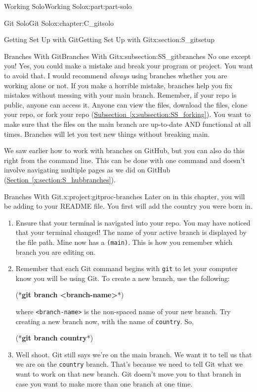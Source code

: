 \documentclass[oneside,10pt,]{book}
\newcommand{\xreffont}{\relax}
\newcommand{\mono}[1]{\texttt{#1}}
\newcommand{\consoleinput}[1]{\textbf{#1}}
\begin{document}
\begin{partptx}{Working Solo}{}{Working Solo}{}{}{x:part:part-solo}
\begin{chapterptx}{Git Solo}{}{Git Solo}{}{}{x:chapter:C_gitsolo}
\begin{sectionptx}{Getting Set Up with Git}{}{Getting Set Up with Git}{}{}{x:section:S_gitsetup}
\begin{subsectionptx}{Branches With Git}{}{Branches With Git}{}{}{x:subsection:SS_gitbranches}
No one except you! Yes, you could make a mistake and break your program or project. You want to avoid that. I would recommend \emph{always} using branches whether you are working alone or not. If you make a horrible mistake, branches help you fix mistakes without messing with your main branch. Remember, if your repo is public, anyone can access it. Anyone can view the files, download the files, clone your repo, or fork your repo (\hyperref[x:subsection:SS_forking]{Subsection~{\xreffont\ref{x:subsection:SS_forking}}}). You want to make sure that the files on the main branch are up-to-date AND functional at all times. Branches will let you test new things without breaking main.%
\par
We saw earlier how to work with branches on GitHub, but you can also do this right from the command line. This can be done with one command and doesn't involve navigating multiple pages as we did on GitHub (\hyperref[x:section:S_hubbranches]{Section~{\xreffont\ref{x:section:S_hubbranches}}}).%
\begin{project}{Branches With Git.}{x:project:gitproc-branches}%
%
%
%
Later on in this chapter, you will be adding to your README file. You first will add the country you were born in.%
\begin{enumerate}[font=\bfseries,label=(\alph*),ref=\alph*]
\item{}Ensure that your terminal is navigated into your repo. You may have noticed that your terminal changed! The name of your active branch is displayed by the file path. Mine now has a \mono{(main)}. This is how you remember which branch you are editing on.%
\item{}Remember that each Git command begins with \mono{git} to let your computer know you will be using Git. To create a new branch, use the following:%
\begin{console}{0}{1}{0}
(*\consoleinput{git branch <branch-name>}*)
\end{console}
where \mono{<branch-name>} is the non-spaced name of your new branch. Try creating a new branch now, with the name of \mono{country}. So,%
\begin{console}{0}{1}{0}
(*\consoleinput{git branch country}*)
\end{console}
\item{}Well shoot. Git still says we're on the main branch. We want it to tell us that we are on the \mono{country} branch. That's because we need to tell Git what we want to work on that new branch. Git doesn't move you to that branch in case you want to make more than one branch at one time.%

\end{enumerate}
\end{project}
\end{subsectionptx}
\end{sectionptx}
\end{chapterptx}
\end{partptx}
\end{document}
